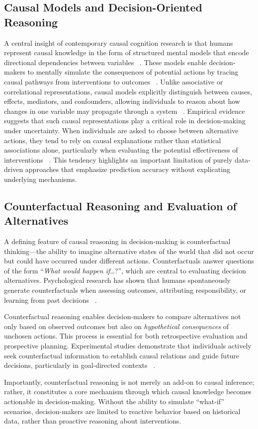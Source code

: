 \documentclass{sfuthesis}
\begin{document}
\subsection{Causal Models and Decision-Oriented Reasoning}
A central insight of contemporary causal cognition research is that humans represent causal knowledge in the form of structured mental models that encode directional dependencies between variables ~\cite{waldmann_causal_2013}. These models enable decision-makers to mentally simulate the consequences of potential actions by tracing causal pathways from interventions to outcomes ~\cite{waldmann_causal_2013}. Unlike associative or correlational representations, causal models explicitly distinguish between causes, effects, mediators, and confounders, allowing individuals to reason about how changes in one variable may propagate through a system ~\cite{waldmann_causal_2013}.
Empirical evidence suggests that such causal representations play a critical role in decision-making under uncertainty. When individuals are asked to choose between alternative actions, they tend to rely on causal explanations rather than statistical associations alone, particularly when evaluating the potential effectiveness of interventions ~\cite{spellman_relation_2001}. This tendency highlights an important limitation of purely data-driven approaches that emphasize prediction accuracy without explicating underlying mechanisms.
\subsection{Counterfactual Reasoning and Evaluation of Alternatives}
A defining feature of causal reasoning in decision-making is counterfactual thinking—the ability to imagine alternative states of the world that did not occur but could have occurred under different actions. Counterfactuals answer questions of the form “\textit{What would happen if…}?”, which are central to evaluating decision alternatives. Psychological research has shown that humans spontaneously generate counterfactuals when assessing outcomes, attributing responsibility, or learning from past decisions ~\cite{roese_counterfactual_1999}.\par
Counterfactual reasoning enables decision-makers to compare alternatives not only based on observed outcomes but also on \textit{hypothetical consequences} of unchosen actions. This process is essential for both retrospective evaluation and prospective planning. Experimental studies demonstrate that individuals actively seek counterfactual information to establish causal relations and guide future decisions, particularly in goal-directed contexts ~\cite{gerstenberg_counterfactual_2024}.\par
Importantly, counterfactual reasoning is not merely an add-on to causal inference; rather, it constitutes a core mechanism through which causal knowledge becomes actionable in decision-making. Without the ability to simulate “what-if” scenarios, decision-makers are limited to reactive behavior based on historical data, rather than proactive reasoning about interventions.
\end{document}
